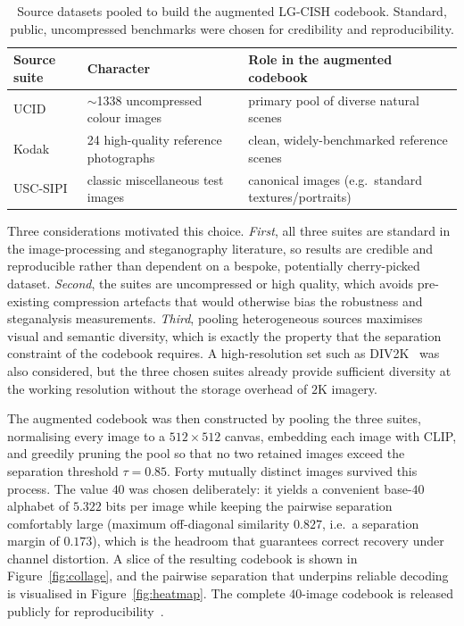 \documentclass[11pt]{article}
\begin{document}
\begin{table}[H]
\centering
\caption{Source datasets pooled to build the augmented LG-CISH codebook. Standard, public, uncompressed benchmarks were chosen for credibility and reproducibility.}\label{tab:datasets}
\begin{tabular}{@{}lll@{}}
\toprule
Source suite & Character & Role in the augmented codebook \\
\midrule
UCID   & $\sim$1338 uncompressed colour images & primary pool of diverse natural scenes \\
Kodak  & 24 high-quality reference photographs & clean, widely-benchmarked reference scenes \\
USC-SIPI & classic miscellaneous test images   & canonical images (e.g.\ standard textures/portraits) \\
\bottomrule
\end{tabular}
\end{table}

Three considerations motivated this choice. \emph{First}, all three suites are
standard in the image-processing and steganography literature, so results are
credible and reproducible rather than dependent on a bespoke, potentially
cherry-picked dataset. \emph{Second}, the suites are uncompressed or high quality,
which avoids pre-existing compression artefacts that would otherwise bias the
robustness and steganalysis measurements. \emph{Third}, pooling heterogeneous
sources maximises visual and semantic diversity, which is exactly the property that
the separation constraint of the codebook requires. A high-resolution set such as
DIV2K~\cite{div2k2017} was also considered, but the three chosen suites already provide sufficient
diversity at the working resolution without the storage overhead of $2$K imagery.

The augmented codebook was then constructed by pooling the three suites, normalising
every image to a $512\times512$ canvas, embedding each image with CLIP, and greedily
pruning the pool so that no two retained images exceed the separation threshold
$\tau{=}0.85$. Forty mutually distinct images survived this process. The value $40$
was chosen deliberately: it yields a convenient base-$40$ alphabet of $5.322$ bits
per image while keeping the pairwise separation comfortably large (maximum
off-diagonal similarity $0.827$, i.e.\ a separation margin of $0.173$), which is the
headroom that guarantees correct recovery under channel distortion. A slice of the
resulting codebook is shown in Figure~\ref{fig:collage}, and the pairwise separation
that underpins reliable decoding is visualised in Figure~\ref{fig:heatmap}. The
complete $40$-image codebook is released publicly for reproducibility~\cite{lgcishdata}.
\end{document}
